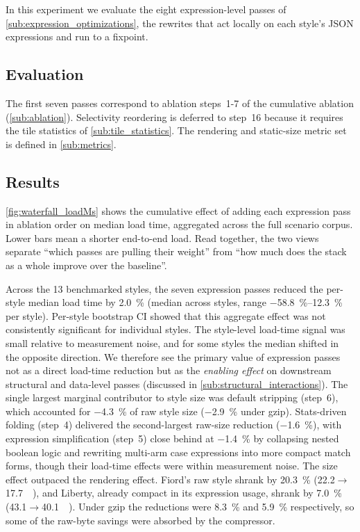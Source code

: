 \noindent In this experiment we evaluate the eight expression-level passes of \cref{sub:expression_optimizations}, the rewrites that act locally on each style's \ac{JSON} expressions and run to a fixpoint.

\subsection{Evaluation}\label{sub:expr_evaluation}

The first seven passes correspond to ablation steps~1-7 of the cumulative ablation (\cref{sub:ablation}).
Selectivity reordering is deferred to step~16 because it requires the tile statistics of \cref{sub:tile_statistics}.
The rendering and static-size metric set is defined in \cref{sub:metrics}.

\subsection{Results}\label{sub:expr_results}

\cref{fig:waterfall_loadMs} shows the cumulative effect of adding each expression pass in ablation order on median load time, aggregated across the full scenario corpus.
Lower bars mean a shorter end-to-end load.
Read together, the two views separate \enquote{which passes are pulling their weight} from \enquote{how much does the stack as a whole improve over the baseline}.

Across the 13 benchmarked styles, the seven expression passes reduced the per-style median load time by \qty{2.0}{\percent} (median across styles, range \qtyrange{-58.8}{+12.3}{\percent} per style).
Per-style bootstrap \ac{CI} showed that this aggregate effect was not consistently significant for individual styles.
The style-level load-time signal was small relative to measurement noise, and for some styles the median shifted in the opposite direction.
We therefore see the primary value of expression passes not as a direct load-time reduction but as the \emph{enabling effect} on downstream structural and data-level passes (discussed in \cref{sub:structural_interactions}).
The single largest marginal contributor to style size was default stripping (step~6), which accounted for \qty{-4.3}{\percent} of raw style size (\qty{-2.9}{\percent} under gzip).
Stats-driven folding (step~4) delivered the second-largest raw-size reduction (\qty{-1.6}{\percent}), with expression simplification (step~5) close behind at \qty{-1.4}{\percent} by collapsing nested boolean logic and rewriting multi-arm case expressions into more compact match forms, though their load-time effects were within measurement noise.
The size effect outpaced the rendering effect.
Fiord's raw style shrank by \qty{20.3}{\percent} (\num{22.2}$\to$\qty{17.7}{\kilo\byte}), and Liberty, already compact in its expression usage, shrank by \qty{7.0}{\percent} (\num{43.1}$\to$\qty{40.1}{\kilo\byte}).
Under gzip the reductions were \qty{8.3}{\percent} and \qty{5.9}{\percent} respectively, so some of the raw-byte savings were absorbed by the compressor.

